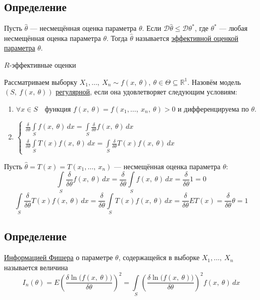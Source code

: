 \documentclass[12pt, a4paper]{article}
\newcommand{\dev}{\mathcal{D}}
\begin{document}
\subsection*{Определение}
Пусть $\hat{\theta}$ --- несмещённая оценка параметра $\theta$. Если $\dev\hat{\theta} \leq \dev \theta^*$, где $\theta^*$ --- любая несмещённая оценка параметра $\theta$. Тогда $\hat{\theta}$ называется \underline{эффективной оценкой параметра} $\theta$.
\begin{center}
    $R$-эффективные оценки
\end{center}
Рассматриваем выборку $X_1,\ldots,\ X_n \sim f(x,\ \theta),\ \theta\in \Theta \subseteq \mathbb{R}^1$. Назовём модель $(S,\ f(x,\ \theta))$ \underline{регулярной}, если она удовлетворяет следующим условиям:
\begin{enumerate}
    \item $\forall x\in S\quad \text{функция } f(x,\ \theta) = f(x_1,\dots,\ x_n,\ \theta) > 0$ и дифференцируема по $\theta$.
    \item $\begin{cases} \displaystyle\frac{\delta}{\delta \theta} \int\limits_S f(x,\ \theta)\, dx = \int\limits_S \frac{\delta}{\delta \theta} f(x,\ \theta)\, dx\\
        \displaystyle \frac{\delta}{\delta \theta} \int\limits_S T(x)f(x,\ \theta)\, dx = \int\limits_S \frac{\delta}{\delta \theta} T(x) f(x,\ \theta)\, dx \end{cases}$
\end{enumerate}
Пусть $\hat{\theta} = T(x) = T(x_1,\dots,\ x_n)$ --- несмещённая оценка параметра $\theta$:
\[\int\limits_S \frac{\delta}{\delta \theta} f(x,\ \theta)\, dx = \frac{\delta}{\delta \theta} \int\limits_S f(x,\ \theta)\, dx = \frac{\delta}{\delta \theta} 1 = 0\]
\[\int\limits_S \frac{\delta}{\delta \theta} T(x) f(x,\ \theta)\, dx =  \frac{\delta}{\delta \theta} \int\limits_S T(x) f(x,\ \theta) \, dx = \frac{\delta}{\delta\theta} ET(x) = \frac{\delta}{\delta \theta}\theta = 1\]
\subsection*{Определение}
\underline{Информацией Фишера} о параметре $\theta$, содержащейся в выборке $X_1,\dots,\ X_n$ называется величина
\[I_n(\theta) = E\left( \frac{\delta \ln \big(f(x,\ \theta)\big)}{\delta \theta} \right)^2 = \int\limits_S\left( \frac{\delta \ln \big(f(x,\ \theta)\big)}{\delta \theta} \right)^2 f(x,\ \theta)\, dx\]
\end{document}

